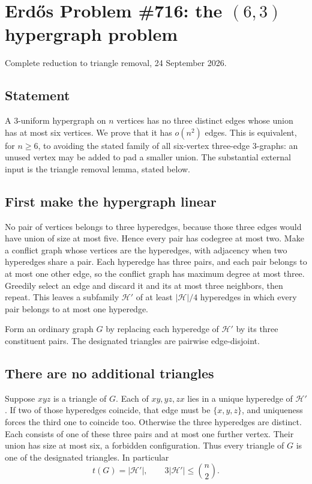 \section{Erd\H{o}s Problem \#716: the $(6,3)$ hypergraph problem}
\noindent Complete reduction to triangle removal, 24 September 2026.

\subsection*{Statement}
A $3$-uniform hypergraph on $n$ vertices has no three distinct edges whose union has at most six vertices. We prove that it has $o(n^2)$ edges. This is equivalent, for $n\geq6$, to avoiding the stated family of all six-vertex three-edge $3$-graphs: an unused vertex may be added to pad a smaller union. The substantial external input is the triangle removal lemma, stated below.

\subsection*{First make the hypergraph linear}
No pair of vertices belongs to three hyperedges, because those three edges would have union of size at most five. Hence every pair has codegree at most two.
Make a conflict graph whose vertices are the hyperedges, with adjacency when two hyperedges share a pair. Each hyperedge has three pairs, and each pair belongs to at most one other edge, so the conflict graph has maximum degree at most three. Greedily select an edge and discard it and its at most three neighbors, then repeat. This leaves a subfamily $\mathcal H'$ of at least $|\mathcal H|/4$ hyperedges in which every pair belongs to at most one hyperedge.

Form an ordinary graph $G$ by replacing each hyperedge of $\mathcal H'$ by its three constituent pairs. The designated triangles are pairwise edge-disjoint.

\subsection*{There are no additional triangles}
Suppose $xyz$ is a triangle of $G$. Each of $xy,yz,zx$ lies in a unique hyperedge of $\mathcal H'$. If two of those hyperedges coincide, that edge must be $\{x,y,z\}$, and uniqueness forces the third one to coincide too.
Otherwise the three hyperedges are distinct. Each consists of one of these three pairs and at most one further vertex. Their union has size at most six, a forbidden configuration. Thus every triangle of $G$ is one of the designated triangles. In particular
\[
 t(G)=|\mathcal H'|,\qquad
 3|\mathcal H'|\leq\binom n2.
\]

